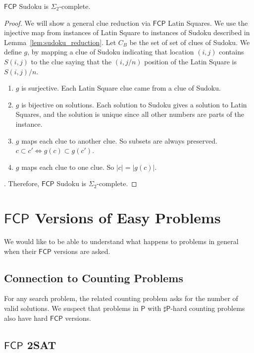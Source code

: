 \documentclass[runningheads,a4paper]{llncs}
\begin{document}
\begin{lemma} 
$\mathsf{FCP}$ Sudoku is $\Sigma_2$-complete.
\end{lemma}

\begin{proof} 
We will show a general clue reduction via $\mathsf{FCP}$ Latin Squares. We use the injective map from instances of Latin Square to instances of Sudoku described in Lemma~\ref{lem:sudoku_reduction}. Let $C_B$ be the set of set of clues of Sudoku. We define $g$, by mapping a clue of Sudoku indicating that location $(i,j)$ contains $S(i,j)$ to the clue saying that the $(i, j/n)$ position of the Latin Square is $S(i, j)/n$. 
\begin{enumerate}
\item $g$ is surjective. Each Latin Square clue came from a clue of Sudoku.
\item $g$ is bijective on solutions. Each solution to Sudoku gives a solution to Latin Squares, and the solution is unique since all other numbers are parts of the instance. 
\item $g$ maps each clue to another clue. So subsets are always preserved. $c \subset c' \iff g(c) \subset g(c')$. 
\item $g$ maps each clue to one clue. So $|c| = |g(c)|$. 
\end{enumerate}
. Therefore, $\mathsf{FCP}$ Sudoku is $\Sigma_2$-complete. 
\end{proof}

\section{$\mathsf{FCP}$ Versions of Easy Problems}
\label{sec:easyproblems}

We would like to be able to understand what happens to problems in general when their $\mathsf{FCP}$ versions are asked.

\subsection{Connection to Counting Problems}

For any search problem, the related counting problem asks for the number of valid solutions. We suspect that problems in $\mathsf{P}$ with $\sharp \mathsf{P}$-hard counting problems also have hard $\mathsf{FCP}$ versions.

\subsection{$\mathsf{FCP}$ 2SAT} 
\end{document}
